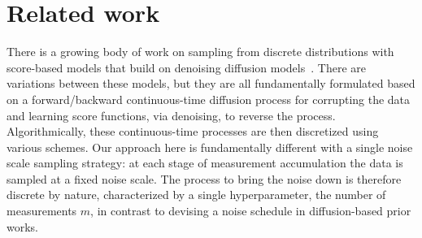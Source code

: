 \section{Related work}
There is a growing body of work on sampling from discrete distributions with score-based models that build on denoising diffusion models~\citep{sohl2015deep, hoogeboom2021argmax, austin2021structured, campbell2022continuous, loudiscrete}.     There are variations between these models, but they are all fundamentally formulated based on a forward/backward continuous-time diffusion process for corrupting the data and learning score functions, via denoising, to reverse the process. Algorithmically, these continuous-time processes are then discretized using various schemes.  Our approach here is fundamentally different with a single noise scale sampling strategy: at each stage of measurement accumulation the data is sampled at a fixed noise scale. The process to bring the noise down is therefore discrete by nature, characterized by a single hyperparameter, the number of measurements $m$, in contrast to devising a noise schedule in diffusion-based prior works.